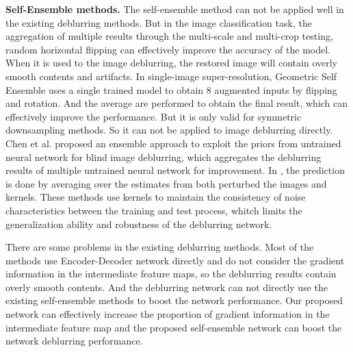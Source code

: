 \begin{sloppypar}
{\bfseries Self-Ensemble methods.} The self-ensemble method can not be applied well in the existing deblurring methods. But in the image classification task, the aggregation of multiple results through the multi-scale and multi-crop testing, random horizontal flipping\cite{19}\cite{20} can effectively improve the accuracy of the model. When it is used to the image deblurring, the restored image will contain overly smooth contents and artifacts. In single-image super-resolution, Geometric Self Ensemble\cite{21} uses a single trained model to obtain 8 augmented inputs by flipping and rotation. And the average are performed to obtain the final result, which can effectively improve the performance. But it is only valid for symmetric downsampling methods. So it can not be applied to image deblurring directly. Chen et al.\cite{22} proposed an ensemble approach to exploit the priors from untrained neural network for blind image deblurring, which aggregates the deblurring results of multiple untrained neural network for improvement. In \cite{23}, the prediction is done by averaging over the estimates from both perturbed the images and kernels. These methods use kernels to maintain the consistency of noise characteristics between the training and test process, whitch limits the generalization ability and robustness of the deblurring network.

There are some problems in the existing deblurring methods. Most of the methods use Encoder-Decoder network directly and do not consider the gradient information in the intermediate feature maps, so the deblurring results contain overly smooth contents. And the deblurring network can not directly use the existing self-ensemble methods to boost the network performance. Our proposed network can effectively increase the proportion of gradient information in the intermediate feature map and the proposed self-ensemble network can boost the network deblurring performance.


\end{sloppypar}
